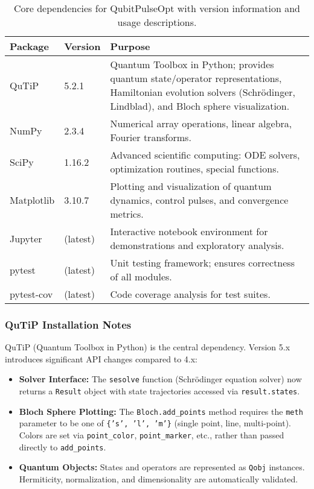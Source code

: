 \documentclass[11pt,a4paper]{article}
\theoremstyle{definition}
\theoremstyle{remark}
\begin{document}
\begin{table}[h]
\centering
\begin{tabular}{@{}llp{7cm}@{}}
\toprule
\textbf{Package} & \textbf{Version} & \textbf{Purpose} \\
\midrule
QuTiP & 5.2.1 & Quantum Toolbox in Python; provides quantum state/operator representations, Hamiltonian evolution solvers (Schrödinger, Lindblad), and Bloch sphere visualization. \\
NumPy & 2.3.4 & Numerical array operations, linear algebra, Fourier transforms. \\
SciPy & 1.16.2 & Advanced scientific computing: ODE solvers, optimization routines, special functions. \\
Matplotlib & 3.10.7 & Plotting and visualization of quantum dynamics, control pulses, and convergence metrics. \\
Jupyter & (latest) & Interactive notebook environment for demonstrations and exploratory analysis. \\
pytest & (latest) & Unit testing framework; ensures correctness of all modules. \\
pytest-cov & (latest) & Code coverage analysis for test suites. \\
\bottomrule
\end{tabular}
\caption{Core dependencies for QubitPulseOpt with version information and usage descriptions.}
\label{tab:dependencies}
\end{table}

\subsubsection{QuTiP Installation Notes}

QuTiP (Quantum Toolbox in Python) is the central dependency. Version 5.x introduces significant API changes compared to 4.x:

\begin{itemize}
    \item \textbf{Solver Interface:} The \texttt{sesolve} function (Schrödinger equation solver) now returns a \texttt{Result} object with state trajectories accessed via \texttt{result.states}.
    \item \textbf{Bloch Sphere Plotting:} The \texttt{Bloch.add\_points} method requires the \texttt{meth} parameter to be one of \texttt{\{'s', 'l', 'm'\}} (single point, line, multi-point). Colors are set via \texttt{point\_color}, \texttt{point\_marker}, etc., rather than passed directly to \texttt{add\_points}.
    \item \textbf{Quantum Objects:} States and operators are represented as \texttt{Qobj} instances. Hermiticity, normalization, and dimensionality are automatically validated.
\end{itemize}
\end{document}
